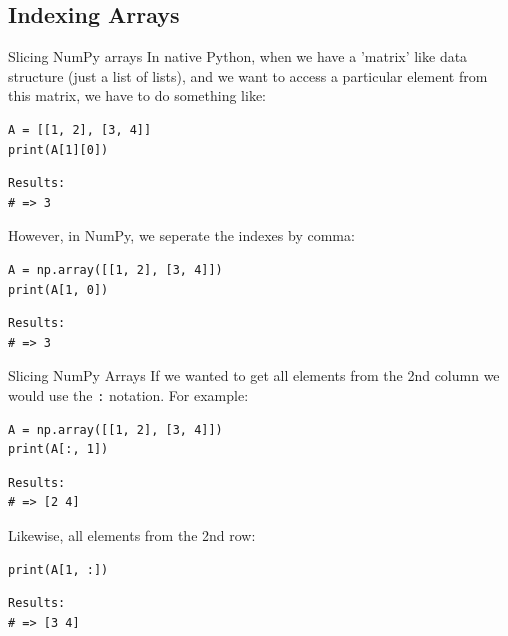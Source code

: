 \documentclass[10pt]{beamer}
\begin{document}
\subsection{Indexing Arrays}
\label{sec:org3456ba6}

\begin{frame}[label={sec:orgfe00bad},fragile]{Slicing NumPy arrays}
 In native Python, when we have a 'matrix' like data structure (just a list of lists),
and we want to access a particular element from this matrix, we have to do something
like:

\begin{verbatim}
A = [[1, 2], [3, 4]]
print(A[1][0])
\end{verbatim}

\begin{verbatim}
Results: 
# => 3
\end{verbatim}


However, in NumPy, we seperate the indexes by comma:

\begin{verbatim}
A = np.array([[1, 2], [3, 4]])
print(A[1, 0])
\end{verbatim}

\begin{verbatim}
Results: 
# => 3
\end{verbatim}
\end{frame}

\begin{frame}[label={sec:org27e6b90},fragile]{Slicing NumPy Arrays}
 If we wanted to get all elements from the 2nd column we would use the \texttt{:} notation. For
example:

\begin{verbatim}
A = np.array([[1, 2], [3, 4]])
print(A[:, 1])
\end{verbatim}

\begin{verbatim}
Results: 
# => [2 4]
\end{verbatim}


Likewise, all elements from the 2nd row:

\begin{verbatim}
print(A[1, :])
\end{verbatim}

\begin{verbatim}
Results: 
# => [3 4]
\end{verbatim}
\end{frame}
\end{document}

